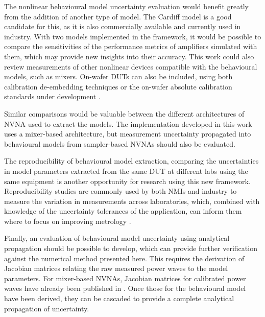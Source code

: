 \documentclass[../thesis/thesis.tex]{subfiles}
\begin{document}
\begin{refsection}
The nonlinear behavioural model uncertainty evaluation would benefit greatly from the addition of another type of model. The Cardiff model \cite{Qi_2009} is a good candidate for this, as it is also commercially available and currently used in industry. With two models implemented in the framework, it would be possible to compare the sensitivities of the performance metrics of amplifiers simulated with them, which may provide new insights into their accuracy. This work could also review measurements of other nonlinear devices compatible with the behavioural models, such as mixers. On-wafer DUTs can also be included, using both calibration de-embedding techniques or the on-wafer absolute calibration standards under development \cite{Long_2016}.

Similar comparisons would be valuable between the different architectures of NVNA used to extract the models. The implementation developed in this work uses a mixer-based architecture, but measurement uncertainty propagated into behavioural models from sampler-based NVNAs should also be evaluated.

The reproducibility of behavioural model extraction, comparing the uncertainties in model parameters extracted from the same DUT at different labs using the same equipment is another opportunity for research using this new framework. Reproducibility studies are commonly used by both NMIs and industry to measure the variation in measurements across laboratories, which, combined with knowledge of the uncertainty tolerances of the application, can inform them where to focus on improving metrology \cite{ISO5725}. 

Finally, an evaluation of behavioural model uncertainty using analytical propagation should be possible to develop, which can provide further verification against the numerical method presented here. This requires the derivation of Jacobian matrices relating the raw measured power waves to the model parameters. For mixer-based NVNAs, Jacobian matrices for calibrated power waves have already been published in \cite{Lin_2012}. Once those for the behavioural model have been derived, they can be cascaded to provide a complete analytical propagation of uncertainty. 

\end{refsection}
\end{document}
